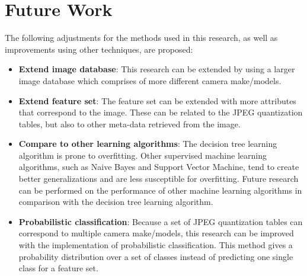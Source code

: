 \section{Future Work}\label{sec:fut}
The following adjustments for the methods used in this research, as well as improvements using other techniques, are proposed:
\begin{itemize}
\item \textbf{Extend image database}: This research can be extended by using a larger image database which comprises of more different camera make/models.
\item \textbf{Extend feature set}: The feature set can be extended with more attributes that correspond to the image. These can be related to the JPEG quantization tables, but also to other meta-data retrieved from the image.
\item \textbf{Compare to other learning algorithms}: The decision tree learning algorithm is prone to overfitting. Other supervised machine learning algorithms, such as Naive Bayes and Support Vector Machine, tend to create better generalizations and are less susceptible for overfitting. Future research can be performed on the performance of other machine learning algorithms in comparison with the decision tree learning algorithm.
\item \textbf{Probabilistic classification}: Because a set of JPEG quantization tables can correspond to multiple camera make/models, this research can be improved with the implementation of probabilistic classification. This method gives a probability distribution over a set of classes instead of predicting one single class for a feature set.

\end{itemize}
